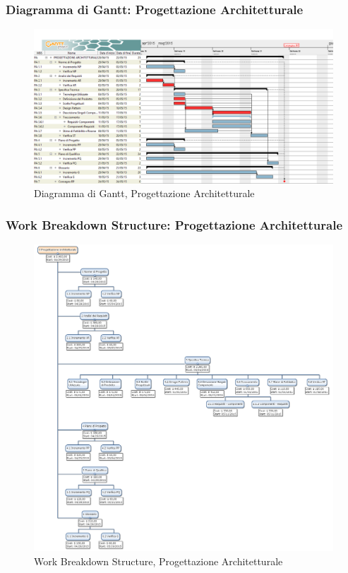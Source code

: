 \subsubsection{Diagramma di Gantt: Progettazione Architetturale}
\begin{figure}[h] 
	\centering
	\includegraphics[width=\textwidth]{./img/progettazione_architetturale.png}
	\caption{Diagramma di Gantt, Progettazione Architetturale}
	\label{fig3}
\end{figure}

\newpage
\subsubsection{Work Breakdown Structure: Progettazione Architetturale}
\begin{figure}[h]
	\centering
	\includegraphics[width=\textwidth]{./img/wbs_progettazione_architetturale.png}
	\caption{Work Breakdown Structure, Progettazione Architetturale}
\end{figure}

